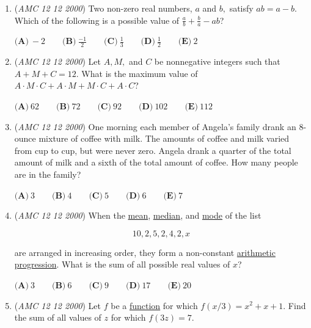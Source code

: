 \begin{enumerate}
	\item (\textit{AMC 12 12 2000}) Two non-zero real numbers, $a$ and $b,$ satisfy $ab = a - b$. Which of the following is a possible value of $\frac {a}{b} + \frac {b}{a} - ab$?


 $\textbf{(A)} \ - 2 \qquad \textbf{(B)} \ \frac {- 1}{2} \qquad \textbf{(C)} \ \frac {1}{3} \qquad \textbf{(D)} \ \frac {1}{2} \qquad \textbf{(E)} \ 2$


	\item (\textit{AMC 12 12 2000}) Let $A, M,$ and $C$ be nonnegative integers such that $A + M + C=12$. What is the maximum value of $A \cdot M \cdot C + A \cdot M + M \cdot C + A \cdot C$?


 $\textbf{(A)}\ 62 \qquad \textbf{(B)}\ 72 \qquad \textbf{(C)}\ 92 \qquad \textbf{(D)}\ 102 \qquad \textbf{(E)}\ 112$


	\item (\textit{AMC 12 12 2000}) One morning each member of Angela’s family drank an $8$-ounce mixture of coffee with milk. The amounts of coffee and milk varied from cup to cup, but were never zero. Angela drank a quarter of the total amount of milk and a sixth of the total amount of coffee. How many people are in the family?


 $\textbf {(A)}\ 3 \qquad \textbf {(B)}\ 4 \qquad \textbf {(C)}\ 5 \qquad \textbf {(D)}\ 6 \qquad \textbf {(E)}\ 7$


	\item (\textit{AMC 12 12 2000}) When the \href{https://artofproblemsolving.com/wiki/index.php?title=Mean}{mean}, \href{https://artofproblemsolving.com/wiki/index.php?title=Median}{median}, and \href{https://artofproblemsolving.com/wiki/index.php?title=Mode}{mode} of the list


 
 \[10,2,5,2,4,2,x\]


 are arranged in increasing order, they form a non-constant \href{https://artofproblemsolving.com/wiki/index.php?title=Arithmetic\_progression}{arithmetic progression}. What is the sum of all possible real values of $x$?


 $\textbf {(A)}\ 3 \qquad \textbf {(B)}\ 6 \qquad \textbf{(C)}\ 9 \qquad \textbf {(D)}\ 17 \qquad \textbf {(E)}\ 20$


	\item (\textit{AMC 12 12 2000}) Let $f$ be a \href{https://artofproblemsolving.com/wiki/index.php?title=Function}{function} for which $f(x/3) = x^2 + x + 1$. Find the sum of all values of $z$ for which $f(3z) = 7$.



\end{enumerate}
